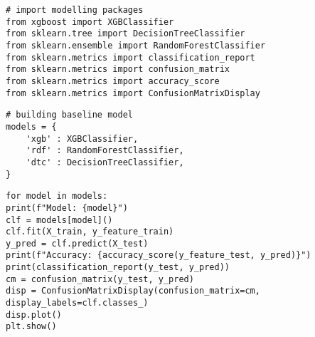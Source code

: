 \label{code:modeling_packages}
\begin{verbatim}
# import modelling packages
from xgboost import XGBClassifier
from sklearn.tree import DecisionTreeClassifier
from sklearn.ensemble import RandomForestClassifier
from sklearn.metrics import classification_report
from sklearn.metrics import confusion_matrix
from sklearn.metrics import accuracy_score
from sklearn.metrics import ConfusionMatrixDisplay
\end{verbatim}


\label{code:model_dict}
\begin{verbatim}
# building baseline model
models = {
	'xgb' : XGBClassifier,
	'rdf' : RandomForestClassifier,
	'dtc' : DecisionTreeClassifier,
}
\end{verbatim}


\label{code:create_train_evaluate}
\begin{verbatim}
for model in models:
print(f"Model: {model}")
clf = models[model]()
clf.fit(X_train, y_feature_train)
y_pred = clf.predict(X_test)
print(f"Accuracy: {accuracy_score(y_feature_test, y_pred)}")
print(classification_report(y_test, y_pred))
cm = confusion_matrix(y_test, y_pred)
disp = ConfusionMatrixDisplay(confusion_matrix=cm, display_labels=clf.classes_)
disp.plot()
plt.show()
\end{verbatim}